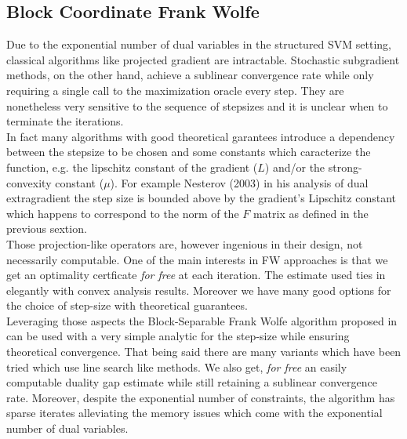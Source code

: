 \subsection{Block Coordinate Frank Wolfe}
Due to the exponential number of dual variables in the structured SVM setting,
classical algorithms like projected gradient are intractable. Stochastic
subgradient methods, on the other hand, achieve a sublinear convergence rate
while only requiring a single call to the maximization oracle every step. They
are nonetheless very sensitive to the sequence of stepsizes and it is unclear
when to terminate the iterations. \\

In fact many algorithms with good theoretical garantees introduce a dependency
between the stepsize to be chosen and some constants which caracterize the
function, e.g. the lipschitz constant of the gradient ($L$) and/or the
strong-convexity constant ($\mu$). For example Nesterov (2003) in his analysis
of dual extragradient the step size is bounded above by the gradient's Lipschitz
constant which happens to correspond to the norm of the $F$ matrix as defined in
the previous sextion.\\

Those projection-like operators are, however ingenious in their design, not
necessarily computable. One of the main interests in FW approaches is that we
get an optimality certficate \textit{for free} at each iteration. The estimate
used ties in elegantly with convex analysis results. Moreover we have many good
options for the choice of step-size with theoretical guarantees.\\

Leveraging those aspects the Block-Separable Frank Wolfe algorithm proposed in
\cite{lacoste-julienBlockCoordinateFrankWolfeOptimization2013} can be used with
a very simple analytic for the step-size while ensuring theoretical convergence.
That being said there are many variants which have been tried which use line
search like methods. We also get, \textit{for free} an easily computable duality
gap estimate while still retaining a sublinear convergence rate. Moreover,
despite the exponential number of constraints, the algorithm has sparse iterates
alleviating the memory issues which come with the exponential number of dual
variables. 

